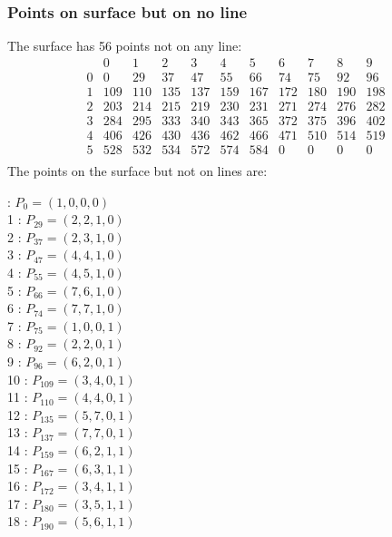 \documentclass{article}
\begin{document}
{\subsubsection*{Points on surface but on no line}
The surface has 56 points not on any line:\\
$$
\begin{array}{r|*{10}{r}}
 & 0 & 1 & 2 & 3 & 4 & 5 & 6 & 7 & 8 & 9\\
\hline
0 & 0 & 29 & 37 & 47 & 55 & 66 & 74 & 75 & 92 & 96\\
1 & 109 & 110 & 135 & 137 & 159 & 167 & 172 & 180 & 190 & 198\\
2 & 203 & 214 & 215 & 219 & 230 & 231 & 271 & 274 & 276 & 282\\
3 & 284 & 295 & 333 & 340 & 343 & 365 & 372 & 375 & 396 & 402\\
4 & 406 & 426 & 430 & 436 & 462 & 466 & 471 & 510 & 514 & 519\\
5 & 528 & 532 & 534 & 572 & 574 & 584 & 0 & 0 & 0 & 0\\
\end{array}
$$
The points on the surface but not on lines are:\\
\begin{multicols}{2}
 : $P_{0}=( 1, 0, 0, 0 )$\\
1 : $P_{29}=( 2, 2, 1, 0 )$\\
2 : $P_{37}=( 2, 3, 1, 0 )$\\
3 : $P_{47}=( 4, 4, 1, 0 )$\\
4 : $P_{55}=( 4, 5, 1, 0 )$\\
5 : $P_{66}=( 7, 6, 1, 0 )$\\
6 : $P_{74}=( 7, 7, 1, 0 )$\\
7 : $P_{75}=( 1, 0, 0, 1 )$\\
8 : $P_{92}=( 2, 2, 0, 1 )$\\
9 : $P_{96}=( 6, 2, 0, 1 )$\\
10 : $P_{109}=( 3, 4, 0, 1 )$\\
11 : $P_{110}=( 4, 4, 0, 1 )$\\
12 : $P_{135}=( 5, 7, 0, 1 )$\\
13 : $P_{137}=( 7, 7, 0, 1 )$\\
14 : $P_{159}=( 6, 2, 1, 1 )$\\
15 : $P_{167}=( 6, 3, 1, 1 )$\\
16 : $P_{172}=( 3, 4, 1, 1 )$\\
17 : $P_{180}=( 3, 5, 1, 1 )$\\
18 : $P_{190}=( 5, 6, 1, 1 )$\\

\end{multicols}}
\end{document}
